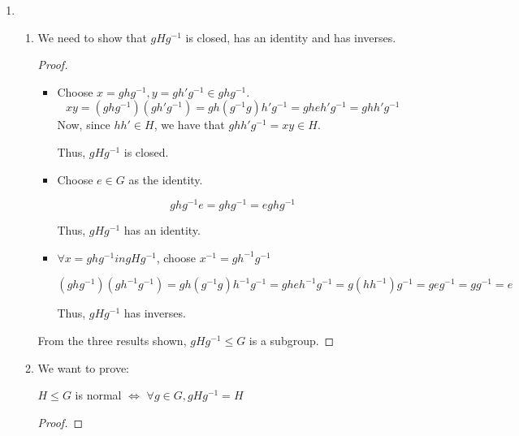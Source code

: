 \documentclass[12pt,letterpaper]{article}
\newcommand{\KER}[1]{\text{ker }#1}
\newcommand{\ghg}[1]{g#1g^{-1}}
\begin{document}
\begin{enumerate}
\begin{proof}
        Thus, we have shown both directions and $\varphi(x) = \varphi(y) \iff xy^{-1} \in \KER{\varphi}$.
      \end{proof}

    \item
      \begin{enumerate}
        \item
          We need to show that $gHg^{-1}$ is closed, has an identity and has inverses.

          \begin{proof}
            \begin{itemize}
              \item

                Choose $x = \ghg{h}, y = \ghg{h'} \in \ghg{h}$.
                \[
                  xy = (\ghg{h})(\ghg{h'}) = \ghg{h(g^{-1}g)h'} = \ghg{heh'} = \ghg{hh'}
                \]
                Now, since $hh' \in H$, we have that $\ghg{hh'} = xy \in H$.

                Thus, $\ghg{H}$ is closed.

              \item

                Choose $e \in G$ as the identity.

                \[
                  \ghg{h}e = \ghg{h} = e\ghg{h}
                \]

                Thus, $\ghg{H}$ has an identity.

              \item

                $\forall x = \ghg{h} in \ghg{H}$, choose $x^{-1} = \ghg{h^{-1}}$

                \[
                  (\ghg{h})(\ghg{h^{-1}}) = \ghg{h(g^{-1}g)h^{-1}} = \ghg{heh^{-1}} = \ghg{(hh^{-1})} = \ghg{e} = \ghg{} = e
                \]

                Thus, $\ghg{H}$ has inverses.
            \end{itemize}

            From the three results shown, $\ghg{H} \le G$ is a subgroup.
          \end{proof}

        \item
          We want to prove:

          $H \le G$ is normal $\iff$ $\forall g \in G, \ghg{H} = H$

          \begin{proof}


\end{proof}
\end{enumerate}
\end{enumerate}
\end{document}
